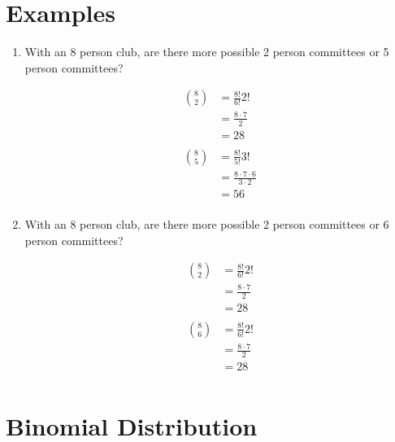\documentclass[letterpaper, landscape]{exam}
\begin{document}
  \section{Examples}
  \begin{enumerate}
    \item With an 8 person club, are there more possible 2 person committees or
      5 person committees?

      \begin{solution}
        \begin{align*}
          \binom{8}{2} & = \frac{8!}{6!}{2!} \\
                      & = \frac{8 \cdot 7}{2} \\
                      & = 28 \\
                      \\
          \binom{8}{5} & = \frac{8!}{5!}{3!} \\
                      & = \frac{8 \cdot 7 \cdot 6}{3 \cdot 2} \\
                      & = 56 \\
        \end{align*}
      \end{solution}

    \item With an 8 person club, are there more possible 2 person committees or
      6 person committees?

      \begin{solution}
        \begin{align*}
          \binom{8}{2} & = \frac{8!}{6!}{2!} \\
                      & = \frac{8 \cdot 7}{2} \\
                      & = 28 \\
                      \\
          \binom{8}{6} & = \frac{8!}{6!}{2!} \\
                      & = \frac{8 \cdot 7}{2} \\
                      & = 28 \\
        \end{align*}
      \end{solution}

  \end{enumerate}

  \section{Binomial Distribution}
\end{document}
